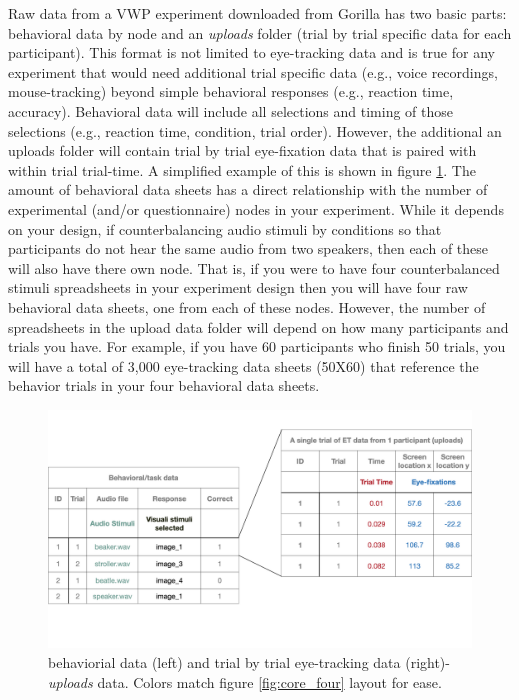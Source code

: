 Raw data from a VWP experiment downloaded from Gorilla has two basic parts: behavioral data by node and an \textit{uploads} folder (trial by trial specific data for each participant). This format is not limited to eye-tracking data and is true for any experiment that would need additional trial specific data (e.g., voice recordings, mouse-tracking) beyond simple behavioral responses (e.g., reaction time, accuracy). Behavioral data will include all selections and timing of those selections (e.g., reaction time, condition, trial order). However, the additional an uploads folder will contain trial by trial eye-fixation data that is paired with within trial trial-time.  A simplified example of this is shown in figure \ref{fig:data_structure}. The amount of behavioral data sheets has a direct relationship with the number of experimental (and/or questionnaire) nodes in your experiment. While it depends on your design, if counterbalancing audio stimuli by conditions so that participants do not hear the same audio from two speakers, then each of these will also have there own node. That is, if you were to have four counterbalanced stimuli spreadsheets in your experiment design then you will have four raw behavioral data sheets, one from each of these nodes. However, the number of spreadsheets in the upload data folder will depend on how many participants and trials you have. For example, if you have 60 participants who finish 50 trials, you will have a total of 3,000 eye-tracking data sheets (50X60) that reference the behavior trials in your four behavioral data sheets.

\begin{figure}[h]
    \centering
    \includegraphics[scale=.2]{figures/data_structure.png}
    \caption{behaviorial data (left) and trial by trial eye-tracking data (right)-\textit{uploads} data. Colors match figure \ref{fig:core_four} layout for ease.}
    \label{fig:data_structure}
\end{figure}


